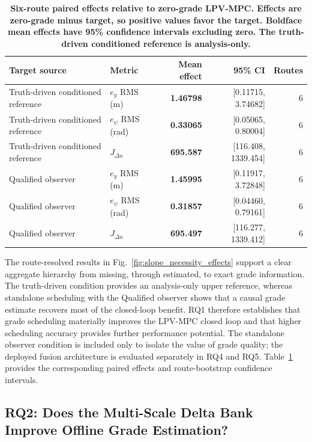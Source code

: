 \documentclass{ieeeaccess}
\begin{document}
\begin{table}[!tbp]
\centering
\caption{\textbf{Six-route paired effects relative to zero-grade LPV-MPC. Effects are zero-grade minus target, so positive values favor the target. Boldface mean effects have 95\% confidence intervals excluding zero. The truth-driven conditioned reference is analysis-only.}}
\label{tab:slope_necessity_effects}
\setlength{\tabcolsep}{3pt}
\begin{tabular}{|l|l|r|r|r|}
\hline
Target source & Metric & Mean effect & 95\% CI & Routes \\
\hline
Truth-driven conditioned reference & $e_y$ RMS (m) & \textbf{1.46798} & [0.11715, 3.74682] & 6 \\
Truth-driven conditioned reference & $e_\psi$ RMS (rad) & \textbf{0.33065} & [0.05065, 0.80004] & 6 \\
Truth-driven conditioned reference & $J_{\Delta u}$ & \textbf{695.587} & [116.408, 1339.454] & 6 \\
Qualified observer & $e_y$ RMS (m) & \textbf{1.45995} & [0.11917, 3.72848] & 6 \\
Qualified observer & $e_\psi$ RMS (rad) & \textbf{0.31857} & [0.04460, 0.79161] & 6 \\
Qualified observer & $J_{\Delta u}$ & \textbf{695.497} & [116.277, 1339.412] & 6 \\
\hline
\end{tabular}
\end{table}

The route-resolved results in Fig.~\ref{fig:slope_necessity_effects} support a clear aggregate hierarchy from missing, through estimated, to exact grade information. The truth-driven condition provides an analysis-only upper reference, whereas standalone scheduling with the Qualified observer shows that a causal grade estimate recovers most of the closed-loop benefit. RQ1 therefore establishes that grade scheduling materially improves the LPV-MPC closed loop and that higher scheduling accuracy provides further performance potential. The standalone observer condition is included only to isolate the value of grade quality; the deployed fusion architecture is evaluated separately in RQ4 and RQ5. Table~\ref{tab:slope_necessity_effects} provides the corresponding paired effects and route-bootstrap confidence intervals.

\subsection{RQ2: Does the Multi-Scale Delta Bank Improve Offline Grade Estimation?}
\end{document}
